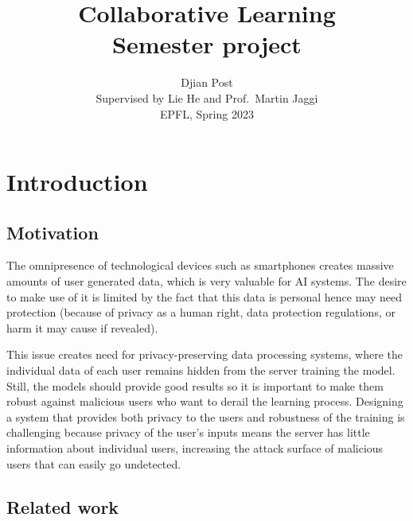 \documentclass{article}
\title{
	Collaborative Learning \\ 
	\medskip
	{\Large Semester project}
}
\author{%
  Djian Post \smallskip \\
  Supervised by Lie He and Prof.~Martin Jaggi \smallskip \\
  EPFL, Spring 2023 \\
}
\begin{document}
\maketitle


\begin{abstract}

\end{abstract}


\section{Introduction}


\subsection{Motivation}


The omnipresence of technological devices such as smartphones creates massive amounts of user generated data, which is very valuable for AI systems. The desire to make use of it is limited by the fact that this data is personal hence may need protection (because of privacy as a human right, data protection regulations, or harm it may cause if revealed). 

This issue creates need for privacy-preserving data processing systems, where the individual data of each user remains hidden from the server training the model. Still, the models should provide good results so it is important to make them robust against malicious users who want to derail the learning process. Designing a system that provides both privacy to the users and robustness of the training is challenging because privacy of the user's inputs means the server has little information about individual users, increasing the attack surface of malicious users that can easily go undetected.








\subsection{Related work}
\end{document}
